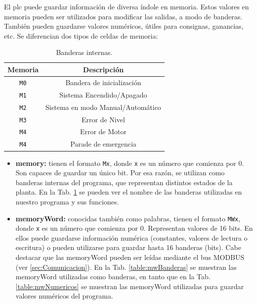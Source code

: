 El \gls{plc} puede guardar información de diversa índole en memoria.
Estos valores en memoria pueden ser utilizados para modificar las salidas, a
modo de banderas.
También pueden guardarse valores numéricos, útiles para consignas,
ganancias, etc.
Se diferencian dos tipos de celdas de memoria:

\begin{table}[ht]
\renewcommand{\arraystretch}{1.3}
\centering
\begin{tabular}{c||c}
\hline
\bfseries Memoria & \bfseries Descripción\\
\hline \hline
\verb|M0|  & Bandera de inicialización\\
\verb|M1|  & Sistema Encendido/Apagado\\
\verb|M2|  & Sistema en modo Manual/Automático\\
\verb|M3|  & Error de Nivel\\
\verb|M4|  & Error de Motor\\
\verb|M4|  & Parade de emergencia\\
\hline
\end{tabular}
\caption{Banderas internas.}
\label{table:Banderasinternas}
\end{table}

\begin{itemize}
 \item \textbf{\gls{memory}:} tienen el formato \verb|Mx|, donde \verb|x| es un
número que comienza por $0$.
Son capaces de guardar un único bit.
Por esa razón, se utilizan como banderas internas del programa, que representan
distintos estados de la planta.
En la Tab. \ref{table:Banderasinternas} se pueden ver el nombre
de las banderas utilizadas en nuestro programa y sus funciones.
 \item \textbf{\gls{memoryWord}:} conocidas también como palabras, tienen el
formato \verb|MWx|, donde \verb|x| es un número que comienza por $0$.
Representan valores de 16 bits. En ellos puede guardarse información numérica
(constantes, valores de lectura o escritura) o pueden utilizarse para guardar
hasta 16 banderas (bits).
Cabe destacar que las \gls{memoryWord} pueden ser leídas mediante el bus MODBUS
(ver \ref{sec:Comunicacion}).
En la Tab. \ref{table:mwBanderas} se muestran las \gls{memoryWord}
utilizadas como banderas, en tanto que en la Tab.
\ref{table:mwNumericos}
se muestran las \gls{memoryWord} utilizadas para guardar valores numéricos del
programa.
\end{itemize}


